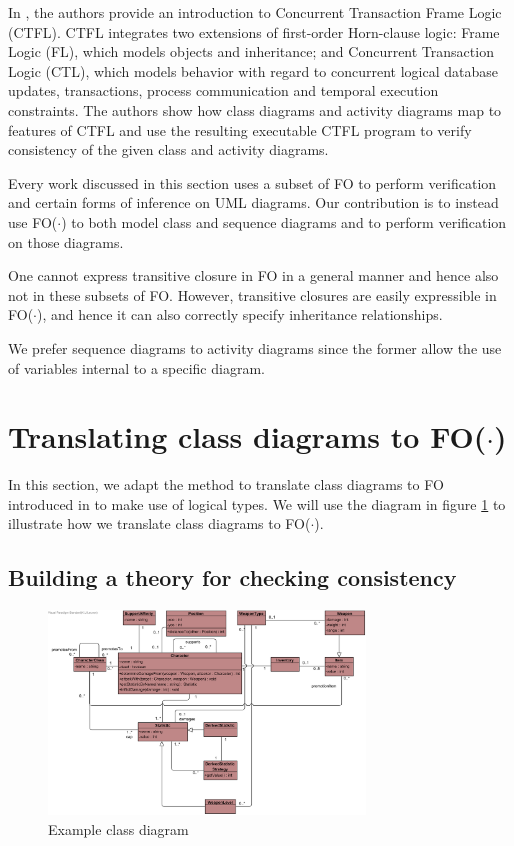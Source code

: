 \documentclass[conference]{IEEEtran}
\begin{document}
In \cite{RamalhoFranklin2004CTFL}, the authors provide an introduction to Concurrent Transaction Frame Logic\cite{kifer1995deductive,kifer1996concurrency} (CTFL). CTFL integrates two extensions of first-order Horn-clause logic: Frame Logic (FL), which models objects and inheritance; and Concurrent Transaction Logic (CTL), which models behavior with regard to concurrent logical database updates, transactions, process communication and temporal execution constraints. The authors show how class diagrams and activity diagrams\cite{RumbaughJames2005Tuml} map to features of CTFL and use the resulting executable CTFL program to verify consistency of the given class and activity diagrams.

Every work discussed in this section uses a subset of FO to perform verification and certain forms of inference on UML diagrams. Our contribution is to instead use FO($\cdot$) to both model class and sequence diagrams and to perform verification on those diagrams.

One cannot express transitive closure in FO in a general manner and hence also not in these subsets of FO. However, transitive closures are easily expressible in FO($\cdot$), and hence it can also correctly specify inheritance relationships. 

We prefer sequence diagrams to activity diagrams since the former allow the use of variables internal to a specific diagram.


\section{Translating class diagrams to FO($\cdot$)}\label{sec:class-diagram}

In this section, we adapt the method to translate class diagrams to FO introduced in \cite{BerardiDaniela2005RoUc} to make use of logical types. We will use the diagram in figure \ref{fig:game-class} to illustrate how we translate class diagrams to FO($\cdot$).

\subsection{Building a theory for checking consistency}\label{sec:consistency}

\begin{figure}[!t]
\centering
\includegraphics[width=0.75\textwidth]{diagram-voorbeeld}
\caption{Example class diagram}
\label{fig:game-class}
\end{figure}
\end{document}
